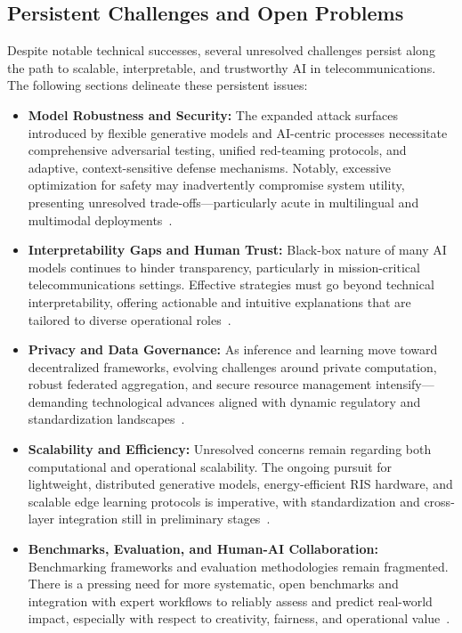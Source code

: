 \documentclass[11pt]{article}
\begin{document}
\subsection{Persistent Challenges and Open Problems}

Despite notable technical successes, several unresolved challenges persist along the path to scalable, interpretable, and trustworthy AI in telecommunications. The following sections delineate these persistent issues:

\begin{itemize}
    \item \textbf{Model Robustness and Security:} The expanded attack surfaces introduced by flexible generative models and AI-centric processes necessitate comprehensive adversarial testing, unified red-teaming protocols, and adaptive, context-sensitive defense mechanisms. Notably, excessive optimization for safety may inadvertently compromise system utility, presenting unresolved trade-offs—particularly acute in multilingual and multimodal deployments~\cite{ref7, ref8, ref9, ref10, ref11, ref12}.
    \item \textbf{Interpretability Gaps and Human Trust:} Black-box nature of many AI models continues to hinder transparency, particularly in mission-critical telecommunications settings. Effective strategies must go beyond technical interpretability, offering actionable and intuitive explanations that are tailored to diverse operational roles~\cite{ref43, ref44, ref45, ref46, ref47, ref48, ref49}.
    \item \textbf{Privacy and Data Governance:} As inference and learning move toward decentralized frameworks, evolving challenges around private computation, robust federated aggregation, and secure resource management intensify—demanding technological advances aligned with dynamic regulatory and standardization landscapes~\cite{ref24, ref25, ref26, ref27, ref38, ref39, ref40}.
    \item \textbf{Scalability and Efficiency:} Unresolved concerns remain regarding both computational and operational scalability. The ongoing pursuit for lightweight, distributed generative models, energy-efficient RIS hardware, and scalable edge learning protocols is imperative, with standardization and cross-layer integration still in preliminary stages~\cite{ref28, ref31, ref32, ref33, ref34, ref35, ref36}.
    \item \textbf{Benchmarks, Evaluation, and Human-AI Collaboration:} Benchmarking frameworks and evaluation methodologies remain fragmented. There is a pressing need for more systematic, open benchmarks and integration with expert workflows to reliably assess and predict real-world impact, especially with respect to creativity, fairness, and operational value~\cite{ref6, ref13, ref19}.
\end{itemize}
\end{document}
